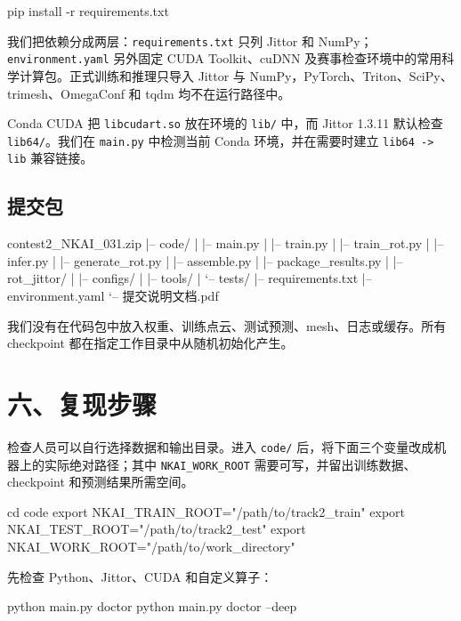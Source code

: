 \documentclass[UTF8,a4paper,11pt,fontset=fandol]{ctexart}
\newcommand{\code}[1]{\nolinkurl{#1}}
\begin{document}
\begin{CodeBlock}
pip install -r requirements.txt
\end{CodeBlock}

我们把依赖分成两层：\code{requirements.txt} 只列 Jittor 和 NumPy；\code{environment.yaml} 另外固定 CUDA Toolkit、cuDNN 及赛事检查环境中的常用科学计算包。正式训练和推理只导入 Jittor 与 NumPy，PyTorch、Triton、SciPy、trimesh、OmegaConf 和 tqdm 均不在运行路径中。

Conda CUDA 把 \code{libcudart.so} 放在环境的 \code{lib/} 中，而 Jittor 1.3.11 默认检查 \code{lib64/}。我们在 \code{main.py} 中检测当前 Conda 环境，并在需要时建立 \code{lib64 -> lib} 兼容链接。

\subsection{提交包}

\begin{CodeBlock}
contest2_NKAI_031.zip
|-- code/
|   |-- main.py
|   |-- train.py
|   |-- train_rot.py
|   |-- infer.py
|   |-- generate_rot.py
|   |-- assemble.py
|   |-- package_results.py
|   |-- rot_jittor/
|   |-- configs/
|   |-- tools/
|   `-- tests/
|-- requirements.txt
|-- environment.yaml
`-- 提交说明文档.pdf
\end{CodeBlock}

我们没有在代码包中放入权重、训练点云、测试预测、mesh、日志或缓存。所有 checkpoint 都在指定工作目录中从随机初始化产生。

\section{六、复现步骤}

检查人员可以自行选择数据和输出目录。进入 \code{code/} 后，将下面三个变量改成机器上的实际绝对路径；其中 \code{NKAI_WORK_ROOT} 需要可写，并留出训练数据、checkpoint 和预测结果所需空间。

\begin{CodeBlock}
cd code
export NKAI_TRAIN_ROOT="/path/to/track2_train"
export NKAI_TEST_ROOT="/path/to/track2_test"
export NKAI_WORK_ROOT="/path/to/work_directory"
\end{CodeBlock}

先检查 Python、Jittor、CUDA 和自定义算子：

\begin{CodeBlock}
python main.py doctor
python main.py doctor --deep
\end{CodeBlock}
\end{document}
